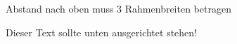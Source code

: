 \documentclass[a3paper,13pt]{tubsposter}
\begin{document}
\begin{gausspage}[designhelper,sender=top]%
  \showtubslogo[right]
  
  \begin{segment}[bgimage=infozentrum.jpg]{3}
     Abstand nach oben muss 3 Rahmenbreiten betragen
  \end{segment}
  \begin{segment}[bgcolor=tuViolet,fgcolor=tuWhite]{2}
    \lipsum[2]
  \end{segment}
  \begin{segment}[b,bgcolor=tuGreenLight]{3}
    Dieser Text sollte unten ausgerichtet stehen!
  \end{segment}
\end{gausspage}
\end{document}
